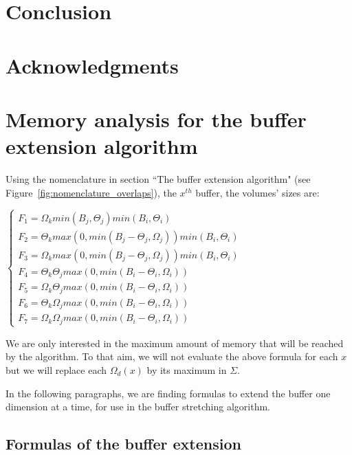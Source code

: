 \documentclass[conference]{IEEEtran}
\begin{document}
\section{Conclusion}

\section{Acknowledgments}




\appendices

\section{Memory analysis for the buffer extension algorithm}
\label{bufferExtensionAlgorithm}

Using the nomenclature in section ``The buffer extension algorithm"
(see Figure~\ref{fig:nomenclature_overlaps}), the $x^{th}$ buffer, the volumes'
sizes are:

$\begin{cases}
F_1 = \Omega_k min(B_j, \Theta_j) min(B_i, \Theta_i) \\
F_2 = \Theta_k max(0, min(B_j - \Theta_j, \Omega_j)) min(B_i, \Theta_i) \\
F_3 = \Omega_k max(0, min(B_j - \Theta_j, \Omega_j)) min(B_i, \Theta_i) \\
F_4 = \Theta_k \Theta_j max(0, min(B_i-\Theta_i, \Omega_i)) \\
F_5 = \Omega_k \Theta_j max(0, min(B_i-\Theta_i, \Omega_i)) \\
F_6 = \Theta_k \Omega_j max(0, min(B_i-\Theta_i, \Omega_i)) \\
F_7 = \Omega_k \Omega_j max(0, min(B_i-\Theta_i, \Omega_i))
\end{cases}$

We are only interested in the maximum amount of memory that will be reached by
the algorithm. To that aim, we will not evaluate the above formula for each $x$
but we will replace each $\Omega_d(x)$ by its maximum in $\Sigma$.

In the following paragraphs, we are finding formulas to extend the buffer one
dimension at a time, for use in the buffer stretching algorithm.

\subsection{Formulas of the buffer extension}
\end{document}

